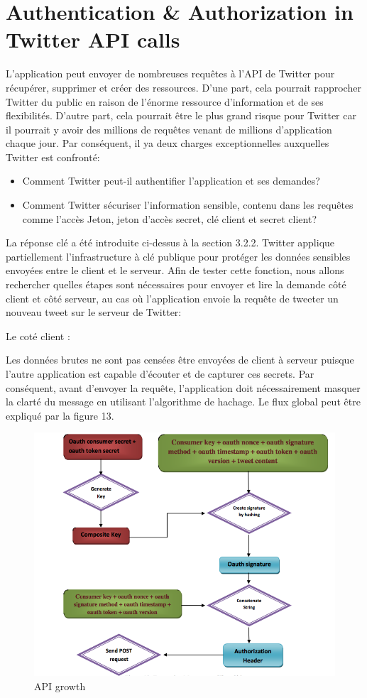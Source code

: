 \section{Authentication \& Authorization in Twitter API calls}
L'application peut envoyer de nombreuses requêtes à l'API de Twitter pour récupérer, supprimer et créer des ressources. D'une part, cela pourrait rapprocher Twitter du public en raison de l'énorme ressource d'information et de ses flexibilités. D'autre part, cela pourrait être le plus grand risque pour Twitter car il pourrait y avoir des millions de requêtes venant de millions d'application chaque jour. Par conséquent, il ya deux charges exceptionnelles auxquelles Twitter est confronté:
\begin{itemize}
\item Comment Twitter peut-il authentifier l'application et ses demandes?
\item Comment Twitter sécuriser l'information sensible, contenu dans les requêtes comme l'accès
Jeton, jeton d'accès secret, clé client et secret client?
\end{itemize}
La réponse clé a été introduite ci-dessus à la section 3.2.2. Twitter applique partiellement l'infrastructure à clé publique pour protéger les données sensibles envoyées entre le client et le serveur. Afin de tester cette fonction, nous allons rechercher quelles étapes sont nécessaires pour envoyer et lire la demande côté client et côté serveur, au cas où l'application envoie la requête de tweeter un nouveau tweet sur le serveur de Twitter:

Le coté client : 

Les données brutes ne sont pas censées être envoyées de client à serveur puisque l'autre application est capable d'écouter et de capturer ces secrets. Par conséquent, avant d'envoyer la requête, l'application doit nécessairement masquer la clarté du message en utilisant l'algorithme de hachage. Le flux global peut être expliqué par la figure 13.
\begin{figure}[! ht ]
			\centering
			\includegraphics[scale=.4]{./images/twitter_client_side.png}
			\caption {API growth}
		\end{figure}
\newpage
		
